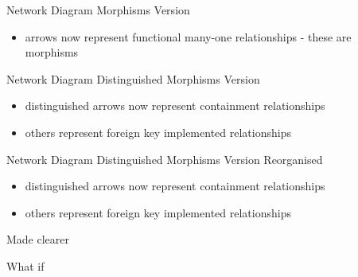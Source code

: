 \begin{frame}{Network Diagram Morphisms Version}

\begin{itemize}
	\item arrows now represent functional many-one relationships - these are morphisms
\end{itemize}
\end{frame}


\begin{frame}{Network Diagram Distinguished Morphisms Version}
\begin{itemize}
	\item distinguished arrows now represent containment relationships
	\item others represent foreign key implemented relationships
\end{itemize}
\end{frame}

\begin{frame}{Network Diagram Distinguished Morphisms Version Reorganised}
\begin{itemize}
	\item distinguished arrows now represent containment relationships
	\item others represent foreign key implemented relationships
\end{itemize}
\end{frame}

\begin{frame}{Made clearer}
\end{frame}

\begin{frame}{What if}
\end{frame}

